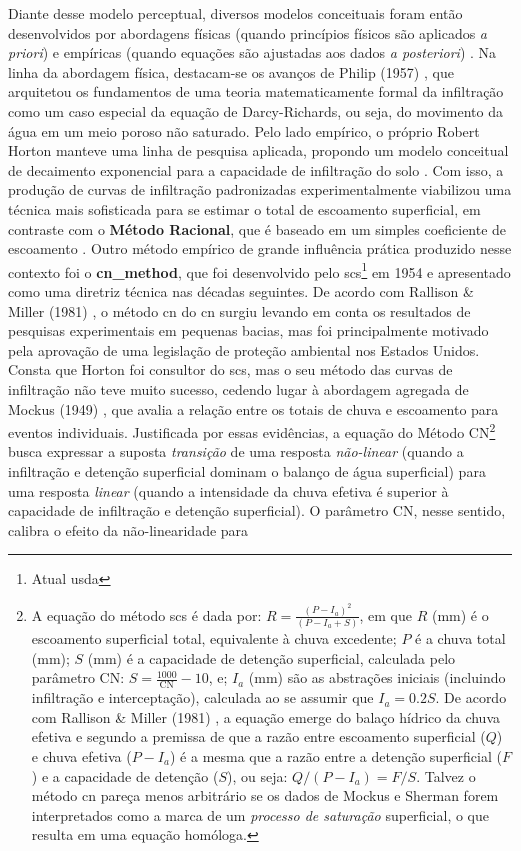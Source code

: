 \documentclass[./main.tex]{subfiles}
\begin{document}
\par Diante desse modelo perceptual, diversos modelos conceituais foram então desenvolvidos por abordagens físicas (quando princípios físicos são aplicados \textit{a priori}) e empíricas (quando equações são ajustadas aos dados \textit{a posteriori})  \cite{mishra2003}. Na linha da abordagem física, destacam-se os avanços de Philip (1957) \cite{philip1957}, que arquitetou os fundamentos de uma teoria matematicamente formal da infiltração como um caso especial da equação de Darcy-Richards, ou seja, do movimento da água em um meio poroso não saturado. Pelo lado empírico, o próprio Robert Horton manteve uma linha de pesquisa aplicada, propondo um modelo conceitual de decaimento exponencial para a capacidade de infiltração do solo \cite{Horton1939}. Com isso, a produção de curvas de infiltração padronizadas experimentalmente viabilizou uma técnica mais sofisticada para se estimar o total de escoamento superficial, em contraste com o \textbf{Método Racional}, que é baseado em um simples coeficiente de escoamento \cite{Cook1946}. Outro método empírico de grande influência prática produzido nesse contexto foi o \textbf{\gls{cn_method}}, que foi desenvolvido pelo \acrfull{scs}\footnote{Atual \acrfull{usda}} em 1954 e apresentado como uma diretriz técnica nas décadas seguintes. De acordo com Rallison \& Miller (1981) \cite{Rallison1981}, o método \acrshort{cn} do \acrshort{cn} surgiu levando em conta os resultados de pesquisas experimentais em pequenas bacias, mas foi principalmente motivado pela aprovação de uma legislação de proteção ambiental nos Estados Unidos. Consta que Horton foi consultor do \acrshort{scs}, mas o seu método das curvas de infiltração não teve muito sucesso, cedendo lugar à abordagem agregada de Mockus (1949) \cite{mockus1949}, que avalia a relação entre os totais de chuva e escoamento para eventos individuais. Justificada por essas evidências, a equação do Método CN\footnote{A equação do método \acrshort{scs} é dada por: $R = \frac{(P - I_a)^{2}}{(P - I_a + S)}$, em que $R$ (mm) é o escoamento superficial total, equivalente à chuva excedente; $P$ é a chuva total (mm); $S$ (mm) é a capacidade de detenção superficial, calculada pelo parâmetro CN: $S = \frac{1000}{\text{CN}}-10$, e; $I_a$ (mm) são as abstrações iniciais (incluindo infiltração e interceptação), calculada ao se assumir que $I_a = 0.2S$. De acordo com Rallison \& Miller (1981) \cite{Rallison1981}, a equação emerge do balaço hídrico da chuva efetiva e segundo a premissa de que a razão entre escoamento superficial ($Q$) e chuva efetiva ($P - I_a$) é a mesma que a razão entre a detenção superficial ($F$) e a capacidade de detenção ($S$), ou seja: $Q/(P-I_a) = F/S$. Talvez o método \acrshort{cn} pareça menos arbitrário se os dados de Mockus e Sherman forem interpretados como a marca de um \textit{processo de saturação} superficial, o que resulta em uma equação homóloga.} busca expressar a suposta \textit{transição} de uma resposta \textit{não-linear} (quando a infiltração e detenção superficial dominam o balanço de água superficial) para uma resposta \textit{linear} (quando a intensidade da chuva efetiva é superior à capacidade de infiltração e detenção superficial). O parâmetro CN, nesse sentido, calibra o efeito da não-linearidade para 
\end{document}
